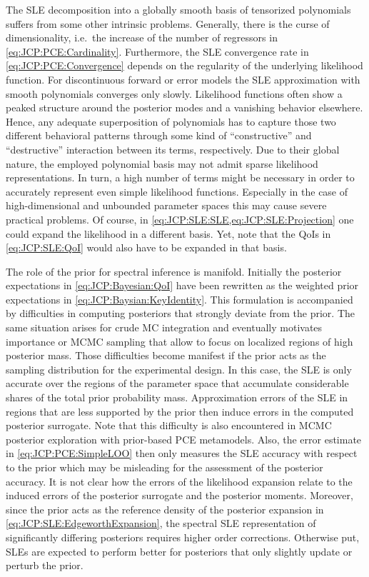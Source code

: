 The SLE decomposition into a globally smooth basis of tensorized polynomials suffers from some other intrinsic problems.
Generally, there is the curse of dimensionality, i.e.\ the increase of the number of regressors in \cref{eq:JCP:PCE:Cardinality}.
Furthermore, the SLE convergence rate in \cref{eq:JCP:PCE:Convergence} depends on the regularity of the underlying likelihood function.
For discontinuous forward or error models the SLE approximation with smooth polynomials converges only slowly.
Likelihood functions often show a peaked structure around the posterior modes and a vanishing behavior elsewhere.
Hence, any adequate superposition of polynomials has to capture those two different behavioral patterns
through some kind of ``constructive'' and ``destructive'' interaction between its terms, respectively.
Due to their global nature, the employed polynomial basis may not admit sparse likelihood representations.
In turn, a high number of terms might be necessary in order to accurately represent even simple likelihood functions.
Especially in the case of high-dimensional and unbounded parameter spaces this may cause severe practical problems.
Of course, in \cref{eq:JCP:SLE:SLE,eq:JCP:SLE:Projection} one could expand the likelihood in a different basis.
Yet, note that the QoIs in \cref{eq:JCP:SLE:QoI} would also have to be expanded in that basis.
\par %
The role of the prior for spectral inference is manifold.
Initially the posterior expectations in \cref{eq:JCP:Bayesian:QoI} have been rewritten as the weighted prior expectations in \cref{eq:JCP:Baysian:KeyIdentity}.
This formulation is accompanied by difficulties in computing posteriors that strongly deviate from the prior.
The same situation arises for crude MC integration and eventually motivates importance or MCMC sampling that allow to focus on localized regions of high posterior mass.
Those difficulties become manifest if the prior acts as the sampling distribution for the experimental design.
In this case, the SLE is only accurate over the regions of the parameter space that accumulate considerable shares of the total prior probability mass.
Approximation errors of the SLE in regions that are less supported by the prior then induce errors in the computed posterior surrogate.
Note that this difficulty is also encountered in MCMC posterior exploration with prior-based PCE metamodels.
Also, the error estimate in \cref{eq:JCP:PCE:SimpleLOO} then only measures the SLE accuracy with respect to the prior which may be misleading for the assessment of the posterior accuracy.
It is not clear how the errors of the likelihood expansion relate to the induced errors of the posterior surrogate and the posterior moments.
Moreover, since the prior acts as the reference density of the posterior expansion in \cref{eq:JCP:SLE:EdgeworthExpansion},
the spectral SLE representation of significantly differing posteriors requires higher order corrections.
Otherwise put, SLEs are expected to perform better for posteriors that only slightly update or perturb the prior.

